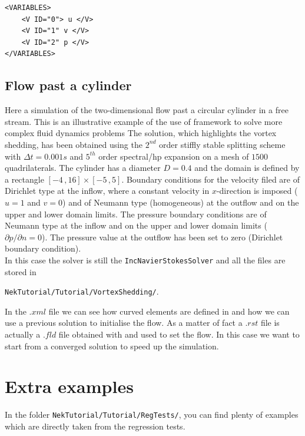 \documentclass[a4paper,12pt]{article}
\begin{document}
\begin{verbatim}
<VARIABLES>
    <V ID="0"> u </V>  
    <V ID="1" v </V>
    <V ID="2" p </V>
</VARIABLES>
\end{verbatim}



\subsection{Flow past a cylinder}
Here a simulation of the two-dimensional flow past a circular cylinder in a free
stream. This is an illustrative example of the use of \nektar framework
to solve more complex fluid dynamics problems The solution, which highlights the
vortex shedding, has been obtained using the $2^{nd}$ order stiffly stable
splitting scheme with $\Delta t = 0.001 s$ and $5^{th}$ order spectral/hp
expansion on a mesh of $1500$ quadrilaterals. The cylinder has a diameter $D =
0.4$ and the domain is defined by a rectangle $[-4\,,16] \times [-5\,,5]$.
Boundary conditions for the velocity filed are of Dirichlet type at the inflow,
where a constant velocity in $x$-direction is imposed ($u = 1$ and $v = 0$) and
of Neumann type (homogeneous) at the outflow and on the upper and lower domain
limits. The pressure boundary conditions are of Neumann type at the inflow and
on the upper and lower domain limits ($\partial p/\partial n = 0$). The pressure
value at the outflow has been set to zero (Dirichlet boundary  condition).\\

In this case the solver is still the \texttt{IncNavierStokesSolver} and all
the files are stored in

\texttt{NekTutorial/Tutorial/VortexShedding/}.

In the
$.xml$ file we can see how curved elements are defined in \nektar and
how we can use a previous solution to initialise the flow. As a matter of fact a
$.rst$ file is actually a $.fld$ file obtained with \nektar and used to
set the flow. In this case we want to start from a converged solution to speed
up the simulation.

\section{Extra examples}

In the folder \texttt{NekTutorial/Tutorial/RegTests/}, you can find plenty of
examples which are directly taken from the regression tests.
\end{document}

